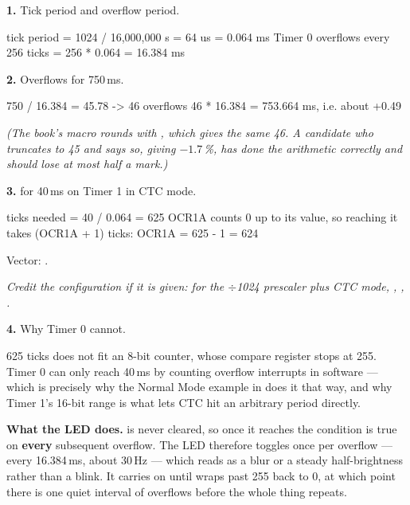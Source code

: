 \textbf{1.} Tick period and overflow period. 

\begin{console}
tick period = 1024 / 16,000,000 s = 64 us = 0.064 ms
Timer 0 overflows every 256 ticks = 256 * 0.064 = 16.384 ms
\end{console}

\textbf{2.} Overflows for 750\,ms. 

\begin{console}
750 / 16.384 = 45.78  ->  46 overflows
46 * 16.384 = 753.664 ms, i.e. about +0.49 %
\end{console}

\noindent\textit{(The book's macro rounds with ,
which gives the same 46. A candidate who truncates to 45 and says so, giving $-1.7$\,\%, has done
the arithmetic correctly and should lose at most half a mark.)}

\textbf{3.}  for 40\,ms on Timer 1 in CTC mode. 

\begin{console}
ticks needed = 40 / 0.064 = 625
OCR1A counts 0 up to its value, so reaching it takes (OCR1A + 1) ticks:
OCR1A = 625 - 1 = 624
\end{console}

\noindent Vector: .

\textit{Credit the configuration if it is given:
 for the $\div$1024 prescaler plus CTC
mode, , , .}

\textbf{4.} Why Timer 0 cannot. 

625 ticks does not fit an 8-bit counter, whose compare register stops at 255. Timer 0 can only
reach 40\,ms by counting overflow interrupts in software --- which is precisely why the Normal Mode
example in  does it that way, and why Timer 1's 16-bit range is what lets CTC hit an
arbitrary period directly.

\textbf{What the LED does.}  is never cleared, so once it reaches 
the condition  is true on \textbf{every} subsequent overflow. The LED
therefore toggles once per overflow --- every 16.384\,ms, about 30\,Hz --- which reads as a blur or
a steady half-brightness rather than a blink. It carries on until  wraps past 255
back to 0, at which point there is one quiet interval of  overflows before the whole
thing repeats. 

